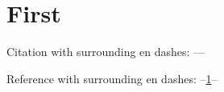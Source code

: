 \documentclass{scrartcl}
\begin{document}
      \section{First} \label{sec:first}
      Citation with surrounding en dashes: --\cite{test}--

      Reference with surrounding en dashes: --\ref{sec:first}--
      
    
\end{document}
